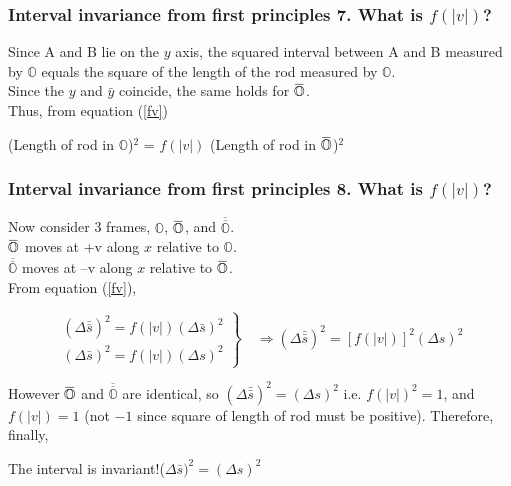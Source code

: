 \documentclass[xcolor=x11names,compress]{beamer}
\renewcommand{\(}{\begin{columns}}
\renewcommand{\)}{\end{columns}}
\newcommand{\<}[1]{\begin{column}{#1}}
\renewcommand{\>}{\end{column}}
\newcommand{\overbar}[1]{\mkern 1.5mu\overline{\mkern-1.5mu#1\mkern-1.5mu}\mkern 1.5mu}
\newcommand{\oframe}{\mathbb{O}}
\newcommand{\obarframe}{\overbar{\mathbb{O}}}
\newcommand{\dobarframe}{\overline{\overline{\mathbb{O}}}}
\begin{document}
\begin{frame}
\frametitle{Interval invariance from first principles 7. What is $f(|v|)$?}

Since A and B lie on the $y$ axis, the squared interval between 
A and B measured by $\oframe$ equals the square of the length of 
the rod measured by $\oframe$.\\
\bigskip
Since the $y$ and $\bar{y}$ coincide, the same holds for $\obarframe$.\\
\bigskip
Thus, from equation (\ref{fv})\\
\bigskip
{}
\begin{beamerboxesrounded}[upper=uppercol,lower=lowercol,shadow=true]
{}{(Length of rod in $\oframe$)$^2$ = $f(|v|)$ (Length of 
rod in $\obarframe$)$^2$}
\end{beamerboxesrounded}

\end{frame}

\begin{frame}
\frametitle{Interval invariance from first principles 8. What is $f(|v|)$?}

Now consider 3 frames, $\oframe$, $\obarframe$, and $\dobarframe$.\\
$\obarframe$ moves at +v along $x$ relative to $\oframe$.\\
$\dobarframe$ moves at --v along $x$ relative to $\obarframe$.\\
From equation (\ref{fv}),

\begin{equation*} \left.
\begin{aligned} 
(\Delta \bar{\bar{s}})^2 = f(|v|) (\Delta \bar{s})^2 \\
(\Delta \bar{s})^2 = f(|v|) (\Delta s)^2
\end{aligned} \right\}
\quad \Longrightarrow (\Delta \bar{\bar{s}})^2 = [f(|v|)]^2 (\Delta s)^2
\end{equation*}

However $\obarframe$ and $\dobarframe$ are identical, so 
$(\Delta \bar{\bar{s}})^2 = (\Delta s)^2$ i.e. $f(|v|)^2 = 1$,
and $f(|v|) = 1$ (not $-1$ since square of length of rod must
be positive).  Therefore, finally,
\begin{beamerboxesrounded}[upper=uppercol,lower=lowercol,shadow=true]
{The interval is invariant!}{($\Delta \bar{s})^2 = (\Delta s)^2$}
\end{beamerboxesrounded}

\end{frame}
\end{document}
